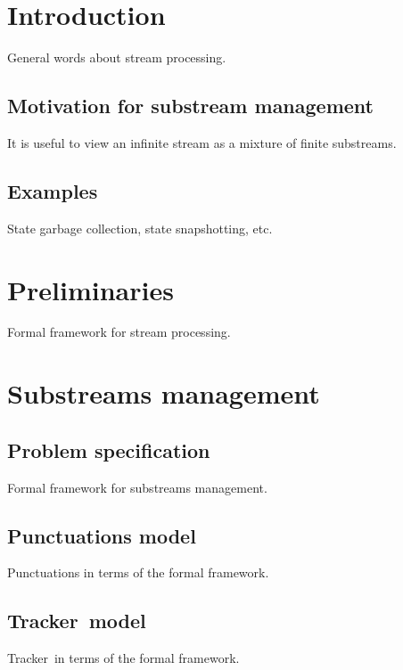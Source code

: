 \documentclass{vldb}
\newcommand {\tracker} {Tracker}
\begin{document}

\thispagestyle{empty}

\section {Introduction}

General words about stream processing.

\subsection{Motivation for substream management}

It is useful to view an infinite stream as a mixture of finite substreams.

\subsection{Examples}

State garbage collection, state snapshotting, etc.

\section{Preliminaries}

Formal framework for stream processing.

\section{Substreams management}

\subsection{Problem specification}

Formal framework for substreams management.

\subsection{Punctuations model}

Punctuations in terms of the formal framework.

\subsection{\tracker\ model}

\tracker\ in terms of the formal framework.
\end{document}
